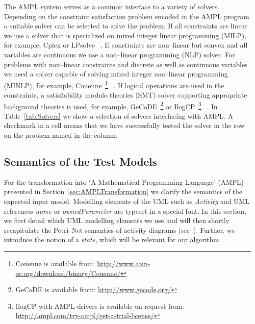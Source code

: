\documentclass[runningheads,a4paper]{llncs}%
\newcommand{\UMLType}[1]{\textsf{\textit{#1}}} %
\newcommand{\UMLReference}[1]{\textsf{\textit{#1}}} %
\begin{document}
The AMPL system serves as a common interface to a variety of solvers. Depending
on the constraint satisfaction problem encoded in the AMPL program a suitable
solver can be selected to solve the problem. If all constraints are linear we
use a solver that is specialized on mixed integer linear programming (MILP), for
example, Cplex or LPsolve ~\cite{lpsolve}. If constraints are non--linear but
convex and all variables are continuous we use a non--linear programming (NLP)
solver. For problems with non--linear constraints and discrete as well as
continuous variables we need a solver capable of solving mixed integer
non--linear programming (MINLP), for example, Couenne~\footnote{Couenne is
available from:
\href{http://www.coin-or.org/download/binary/Couenne/}{http://www.coin-or.org/download/binary/Couenne/}}
~\cite{Belotti09couenne}.
If logical operations are used in the constraints, a satisfiability modulo
theories (SMT) solver supporting appropriate background theories is used, for
example, GeCoDE~\footnote{GeCoDE is available from:
\href{http://www.gecode.org/}{http://www.gecode.org/}} or
IlogCP~\footnote{IlogCP with AMPL drivers is available on request from:
\href{http://ampl.com/try-ampl/get-a-trial-license/}{http://ampl.com/try-ampl/get-a-trial-license/}}
~\cite{ilogcp}.
In Table~\ref{tab:Solvers} we show a selection of solvers interfacing with AMPL.
A checkmark in a cell means that we have successfully tested the solver in the
row on the problem named in the column.%
%
\subsection{Semantics of the Test Models}%
For the transformation into `A Mathematical Programming Language' (AMPL)
presented in Section~\ref{sec:AMPLTransformation} we clarify the semantics of
the expected input model. Modelling elements of the UML such as
\UMLType{Activity} and UML references \UMLReference{name} or
\UMLReference{ownedParameter} are typeset in a special font. In this section, we
first detail which UML modelling elements we use and will then shortly
recapitulate the Petri--Net semantics of activity diagrams
(see~\cite{UML23Superstructure}). Further, we introduce the notion of a
\emph{state}, which will be relevant for our algorithm.
\end{document}
